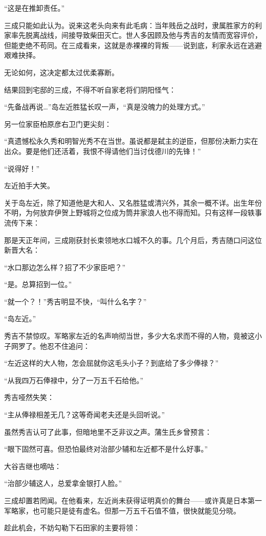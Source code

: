 \documentclass[
]{book}
\begin{document}
``这是在推卸责任。''

三成只能如此认为。说来这老头向来有此毛病：当年贱岳之战时，隶属胜家方的利家率先脱离战线，间接导致柴田灭亡。世人多因顾及他与秀吉的友情而宽容评价，但能吏绝不苟同。在三成看来，这就是赤裸裸的背叛------说到底，利家永远在逃避艰难抉择。

无论如何，这决定都太过优柔寡断。

结果回到宅邸的三成，不得不听自家老将们阴阳怪气：

``先备战再说\ldots{}''岛左近胜猛长叹一声，``真是没魄力的处理方式。''

另一位家臣柏原彦右卫门更尖刻：

``真遗憾松永久秀和明智光秀不在当世。虽说都是弑主的逆臣，但那份决断力实在出众。要是他们还活着，我恨不得请他们当讨伐德川的先锋！''

``说得好！''

左近拍手大笑。

关于岛左近，除了知道他是大和人、又名胜猛或清兴外，其余一概不详。出生年份不明，为何放弃伊贺上野城将之位成为筒井家浪人也不得而知。只有这样一段轶事流传下来：

那是天正年间，三成刚获封长束领地水口城不久的事。几个月后，秀吉随口问这位新晋大名：

``水口那边怎么样？招了不少家臣吧？''

``是。总算招到一位。''

``就一个？！''秀吉明显不快，``叫什么名字？''

``岛左近。''

秀吉不禁惊叹。军略家左近的名声响彻当世，多少大名求而不得的人物，竟被这小子网罗了。他忍不住追问：

``左近这样的大人物，怎会屈就你这毛头小子？到底给了多少俸禄？''

``从我四万石俸禄中，分了一万五千石给他。''

秀吉哑然失笑：

``主从俸禄相差无几？这等奇闻老夫还是头回听说。''

虽然秀吉认可了此事，但暗地里不乏非议之声。蒲生氏乡曾预言：

``眼下固然可喜。但恐怕最终对治部少辅和左近都不是什么好事。''

大谷吉继也嘀咕：

``治部少辅这人，总爱拿金银打人脸。''

三成却置若罔闻。在他看来，左近尚未获得证明真价的舞台------或许真是日本第一军略家，也可能只是徒有虚名。但那一万五千石值不值，很快就能见分晓。

趁此机会，不妨勾勒下石田家的主要将领：
\end{document}
